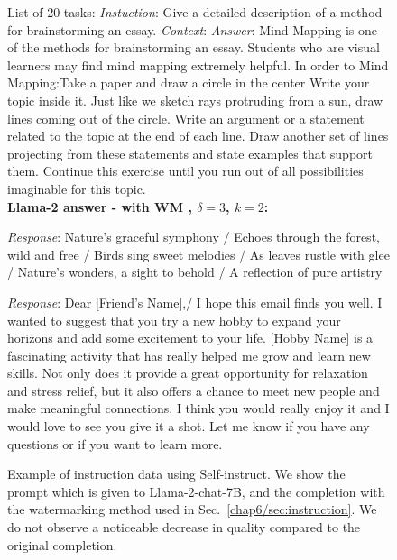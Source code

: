 \begin{figure}[b!]
\begin{tcolorbox}[colframe=metablue, colback=white]
List of 20 tasks:\newline
\textit{Instuction}: Give a detailed description of a method for brainstorming an essay.\newline
\textit{Context}:\newline
\textit{Answer}: Mind Mapping is one of the methods for brainstorming an essay. Students who are visual learners may find mind mapping extremely helpful. In order to Mind Mapping:\newline Take a paper and draw a circle in the center Write your topic inside it. Just like we sketch rays protruding from a sun, draw lines coming out of the circle.  Write an argument or a statement related to the topic at the end of each line. Draw another set of lines projecting from these statements and state examples that support them. Continue this exercise until you run out of all possibilities imaginable for this topic.
\\[8pt]

\textbf{Llama-2 answer - with WM \cite{kirchenbauer2023watermark}, $\delta=3$, $k=2$:}


\newline
{}\newline
\textit{Response}: Nature's graceful symphony / Echoes through the forest, wild and free / Birds sing sweet melodies / As leaves rustle with glee / Nature's wonders, a sight to behold / A reflection of pure artistry \newline


\newline
\textit{Response}: Dear [Friend's Name],/ I hope this email finds you well. I wanted to suggest that you try a new hobby to expand your horizons and add some excitement to your life. [Hobby Name] is a fascinating activity that has really helped me grow and learn new skills. Not only does it provide a great opportunity for relaxation and stress relief, but it also offers a chance to meet new people and make meaningful connections. I think you would really enjoy it and I would love to see you give it a shot. Let me know if you have any questions or if you want to learn more.\newline


    \end{tcolorbox}
    \caption{
        Example of
        instruction data using Self-instruct. 
        We show the prompt which is given to Llama-2-chat-7B, and the completion with the watermarking method used in Sec.~\ref{chap6/sec:instruction}.
        We do not observe a noticeable decrease in quality compared to the original completion.
    }
    \label{chap6/fig:self-instruct-examples}
\end{figure}
